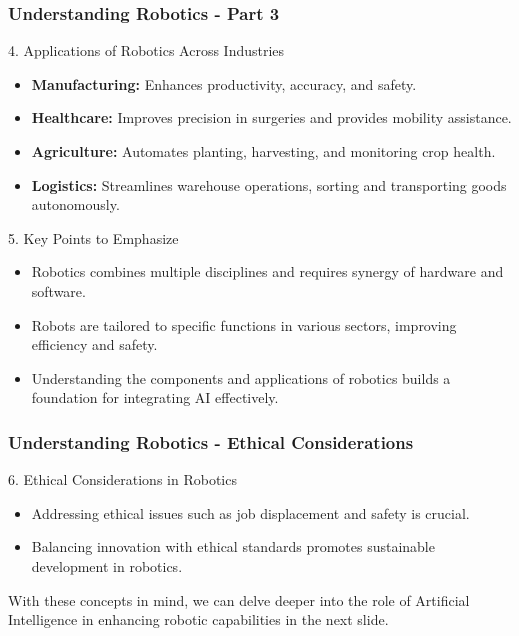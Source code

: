 \documentclass[aspectratio=169]{beamer}
\begin{document}
\begin{frame}[fragile]
    \frametitle{Understanding Robotics - Part 3}
    \begin{block}{4. Applications of Robotics Across Industries}
        \begin{itemize}
            \item \textbf{Manufacturing:} Enhances productivity, accuracy, and safety.
            \item \textbf{Healthcare:} Improves precision in surgeries and provides mobility assistance.
            \item \textbf{Agriculture:} Automates planting, harvesting, and monitoring crop health.
            \item \textbf{Logistics:} Streamlines warehouse operations, sorting and transporting goods autonomously.
        \end{itemize}
    \end{block}

    \begin{block}{5. Key Points to Emphasize}
        \begin{itemize}
            \item Robotics combines multiple disciplines and requires synergy of hardware and software.
            \item Robots are tailored to specific functions in various sectors, improving efficiency and safety.
            \item Understanding the components and applications of robotics builds a foundation for integrating AI effectively.
        \end{itemize}
    \end{block}
\end{frame}

\begin{frame}[fragile]
    \frametitle{Understanding Robotics - Ethical Considerations}
    \begin{block}{6. Ethical Considerations in Robotics}
        \begin{itemize}
            \item Addressing ethical issues such as job displacement and safety is crucial.
            \item Balancing innovation with ethical standards promotes sustainable development in robotics.
        \end{itemize}
    \end{block}
    
    With these concepts in mind, we can delve deeper into the role of Artificial Intelligence in enhancing robotic capabilities in the next slide.
\end{frame}
\end{document}
